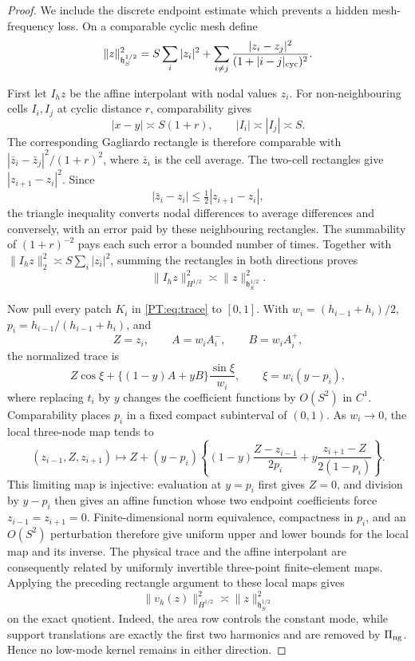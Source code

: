 \begin{proof}
We include the discrete endpoint estimate which prevents a hidden
mesh-frequency loss.  On a comparable cyclic mesh define
\begin{equation}\label{PT:eq:discrete-H}
 \|z\|_{\mathfrak h^{1/2}_S}^2
 =S\sum_i|z_i|^2
 +\sum_{i\ne j}\frac{|z_i-z_j|^2}{(1+|i-j|_{\rm cyc})^2}.
\end{equation}

First let $I_hz$ be the affine interpolant with nodal values $z_i$.
For non-neighbouring cells $I_i,I_j$ at cyclic distance $r$,
comparability gives
\[
 |x-y|\asymp S(1+r),\qquad |I_i|\asymp|I_j|\asymp S.
\]
The corresponding Gagliardo rectangle is therefore comparable with
$|\bar z_i-\bar z_j|^2/(1+r)^2$, where $\bar z_i$ is the cell average.
The two-cell rectangles give $|z_{i+1}-z_i|^2$.  Since
\[
 |\bar z_i-z_i|\le\tfrac12|z_{i+1}-z_i|,
\]
the triangle inequality converts nodal differences to average
differences and conversely, with an error paid by these neighbouring
rectangles.  The summability of $(1+r)^{-2}$ pays each such error a
bounded number of times.
Together with
$\|I_hz\|_2^2\asymp S\sum_i|z_i|^2$, summing the rectangles in both
directions proves
\begin{equation}\label{PT:eq:affine-discrete}
 \|I_hz\|_{H^{1/2}}^2\asymp
 \|z\|_{\mathfrak h^{1/2}_S}^2.
\end{equation}

Now pull every patch $K_i$ in \eqref{PT:eq:trace} to $[0,1]$.  With
$w_i=(h_{i-1}+h_i)/2$, $p_i=h_{i-1}/(h_{i-1}+h_i)$, and
\[
 Z=z_i,\qquad A=w_iA_i^-,\qquad B=w_iA_i^+,
\]
the normalized trace is
\[
 Z\cos\xi+\{(1-y)A+yB\}\frac{\sin\xi}{w_i},
 \qquad \xi=w_i(y-p_i),
\]
where replacing $t_i$ by $y$ changes the coefficient functions by
$O(S^2)$ in $C^1$.  Comparability places $p_i$ in a fixed compact
subinterval of $(0,1)$.  As $w_i\to0$, the local three-node map tends to
\begin{equation}\label{PT:eq:limiting-local-trace}
 (z_{i-1},Z,z_{i+1})\longmapsto
 Z+(y-p_i)\left\{
 (1-y)\frac{Z-z_{i-1}}{2p_i}
 +y\frac{z_{i+1}-Z}{2(1-p_i)}\right\}.
\end{equation}
This limiting map is injective: evaluation at $y=p_i$ first gives
$Z=0$, and division by $y-p_i$ then gives an affine function whose two
endpoint coefficients force $z_{i-1}=z_{i+1}=0$.  Finite-dimensional
norm equivalence, compactness in $p_i$, and an $O(S^2)$ perturbation
therefore give uniform upper and lower bounds for the local map and its
inverse.  The physical trace and the affine interpolant are consequently
related by uniformly invertible three-point finite-element maps.
Applying the preceding rectangle argument to these local maps gives
\begin{equation}\label{PT:eq:discrete-equivalence}
 \|v_h(z)\|_{H^{1/2}}^2
 \asymp\|z\|_{\mathfrak h^{1/2}_S}^2
\end{equation}
on the exact quotient.  Indeed, the area row controls the constant mode,
while support translations are exactly the first two harmonics and are
removed by $\Pi_{\rm ng}$.  Hence no low-mode kernel remains in either direction.


\end{proof}
